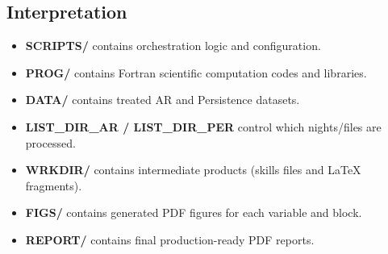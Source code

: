 \documentclass[a4paper,11pt]{article}
\begin{document}
\subsection*{Interpretation}

\begin{itemize}
    \item \textbf{SCRIPTS/} contains orchestration logic and configuration.
    \item \textbf{PROG/} contains Fortran scientific computation codes and libraries.
    \item \textbf{DATA/} contains treated AR and Persistence datasets.
    \item \textbf{LIST\_DIR\_AR / LIST\_DIR\_PER} control which nights/files are processed.
    \item \textbf{WRKDIR/} contains intermediate products (skills files and LaTeX fragments).
    \item \textbf{FIGS/} contains generated PDF figures for each variable and block.
    \item \textbf{REPORT/} contains final production-ready PDF reports.
\end{itemize}
\end{document}
